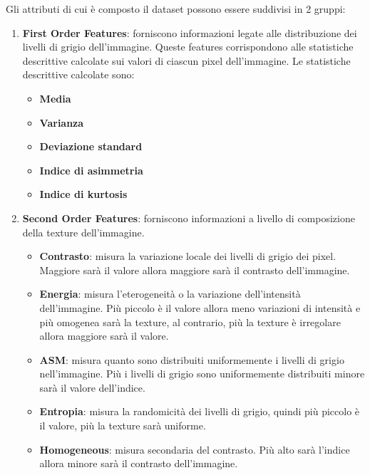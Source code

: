 Gli attributi di cui è composto il dataset possono essere suddivisi in 2 gruppi\cite{explanation-features}:
\begin{enumerate}
    \item \textbf{First Order Features}: forniscono informazioni legate alle
          distribuzione dei livelli di grigio dell'immagine. Queste features
          corrispondono alle statistiche descrittive calcolate sui valori di
          ciascun pixel dell'immagine. Le statistiche descrittive calcolate sono:
          \begin{itemize}
              \item \textbf{Media}
              \item \textbf{Varianza}
              \item \textbf{Deviazione standard}
              \item \textbf{Indice di asimmetria}
              \item \textbf{Indice di kurtosis}
          \end{itemize}
    \item \textbf{Second Order Features}: forniscono informazioni a livello di
          composizione della texture dell'immagine.
          \begin{itemize}
              \item \textbf{Contrasto}: misura la variazione locale dei livelli
                    di grigio dei pixel. Maggiore sarà il valore allora maggiore
                    sarà il contrasto dell'immagine.
              \item \textbf{Energia}: misura l'eterogeneità o la variazione
                    dell'intensità dell'immagine. Più piccolo è il valore allora
                    meno variazioni di intensità e più omogenea sarà la texture,
                    al contrario, più la texture è irregolare allora maggiore
                    sarà il valore.
              \item \textbf{ASM}: misura quanto sono distribuiti uniformemente i
                    livelli di grigio nell'immagine. Più i livelli di grigio sono
                    uniformemente distribuiti minore sarà il valore dell'indice.
              \item \textbf{Entropia}: misura la randomicità dei livelli di
                    grigio, quindi più piccolo è il valore, più la texture
                    sarà uniforme.
              \item \textbf{Homogeneous}: misura secondaria del contrasto. Più
                    alto sarà l'indice allora minore sarà il contrasto dell'immagine.

\end{itemize}
\end{enumerate}
